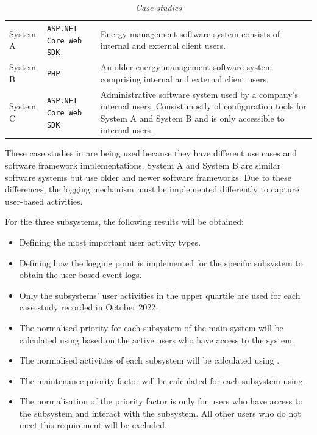 \begin{table}[!htb]
	\centering
	\caption[Case studies]
	{\textit{Case studies}}
	\label{tbl:ch3_caseStudies}
	\begin{tabularx}{\textwidth}{llX}
		\toprule
		\thead{Case study} & \thead{Software framework} & \thead{Description} \\
		\midrule
		\rowcolor{lightgray}
		System A & \texttt{ASP.NET Core Web SDK} & \RaggedRight Energy management software system consists of internal and external client users. \\
		System B & \texttt{PHP} & \RaggedRight An older energy management software system comprising internal and external client users. \\
		\rowcolor{lightgray}
		System C & \texttt{ASP.NET Core Web SDK} & \RaggedRight Administrative software system used by a company's internal users. Consist mostly of configuration tools for System A and System B and is only accessible to internal users. \\
		\bottomrule
	\end{tabularx}
\end{table}

These case studies in  are being used because they have different use cases and software framework implementations. System A and System B are similar software systems but use older and newer software frameworks. Due to these differences, the logging mechanism must be implemented differently to capture user-based activities.\par For the three subsystems, the following results will be obtained:

\begin{itemize}
\item Defining the most important user activity types.
\item Defining how the logging point is implemented for the specific subsystem to obtain the user-based event logs.
\item Only the subsystems' user activities in the upper quartile are used for each case study recorded in October 2022.
\item The normalised priority for each subsystem of the main system will be calculated using  based on the active users who have access to the system.
\item The normalised activities of each subsystem will be calculated using .
\item The maintenance priority factor will be calculated for each subsystem using .
\item The normalisation of the priority factor is only for users who have access to the subsystem and interact with the subsystem. All other users who do not meet this requirement will be excluded.
\end{itemize}


